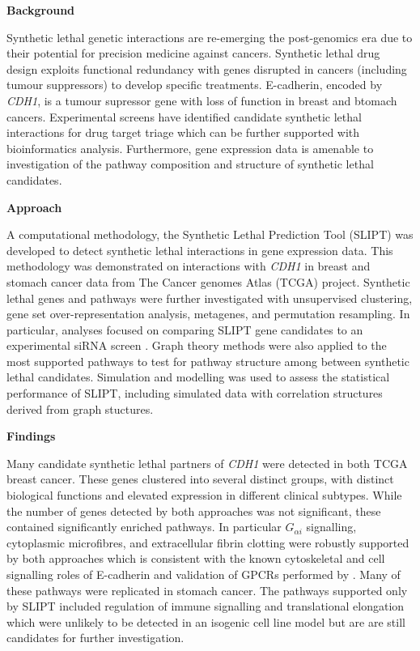 \textbf{Background}

Synthetic lethal genetic interactions are re-emerging the post-genomics era due to their potential for precision medicine against cancers. Synthetic lethal drug design exploits functional redundancy with genes disrupted in cancers (including tumour suppressors) to develop specific treatments. \gls{E-cadherin}, encoded by \textit{CDH1}, is a tumour supressor gene with loss of function in breast and btomach cancers. Experimental screens have identified candidate synthetic lethal interactions for drug target triage which can be further supported with bioinformatics analysis. Furthermore, gene expression data is amenable to investigation of the pathway composition and structure of synthetic lethal candidates. 

\textbf{Approach}

A computational methodology, the Synthetic Lethal Prediction Tool (\acrshort{SLIPT}) was developed to detect synthetic lethal interactions in gene expression data. This methodology was demonstrated on interactions with \textit{CDH1} in breast and stomach cancer data from The Cancer \Glspl{genome} Atlas (\acrshort{TCGA}) project. Synthetic lethal genes and pathways were further investigated with unsupervised clustering, gene set over-representation analysis, metagenes, and permutation resampling. In particular, analyses focused on comparing \acrshort{SLIPT} gene candidates to an experimental \acrshort{siRNA} screen \citet{Telford2015}. Graph theory methods were also applied to the most supported pathways to test for pathway structure among between synthetic lethal candidates. Simulation and modelling was used to assess the statistical performance of \acrshort{SLIPT}, including simulated data with correlation structures derived from graph stuctures.

\textbf{Findings}

Many candidate synthetic lethal partners of \textit{CDH1} were detected in both \acrshort{TCGA} breast cancer. These genes clustered into several distinct groups, with distinct biological functions and elevated expression in different clinical subtypes. While the number of genes detected by both approaches was not significant, these contained significantly enriched pathways. In particular $G_{\alpha i}$ signalling, cytoplasmic microfibres, and extracellular fibrin clotting were robustly supported by both approaches which is consistent with the known cytoskeletal and cell signalling roles of \gls{E-cadherin} and validation of \acrshort{GPCR}s performed by \citet{Telford2015}. Many of these pathways were replicated in stomach cancer. The pathways supported only by \acrshort{SLIPT} included regulation of immune signalling and translational elongation which were unlikely to be detected in an isogenic cell line model but are are still candidates for further investigation. 

